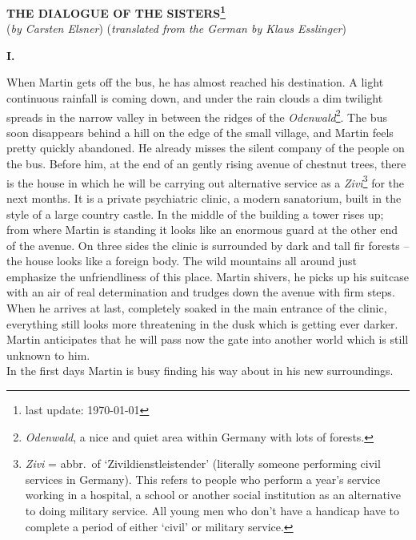 

\begin {center} 
{\bf THE DIALOGUE OF THE SISTERS\footnote{last update: \today}} 
\[\] 
({\em by Carsten Elsner\/}) 
({\em translated from the German by Klaus Esslinger\/}) 
\end {center} 


\begin {center} 
{\bf I.} 
\end {center}
When Martin gets off the bus, he has almost reached his destination. 
A light continuous rainfall is coming down, and under the rain clouds a dim
twilight spreads in the narrow valley in between the ridges of the 
{\em Odenwald\/}\footnote {{\em Odenwald}, a nice and quiet area 
within Germany with lots of forests.}. 
The bus soon disappears behind a hill on the edge of the small village, 
and Martin feels pretty quickly abandoned. He already misses the silent company of the people on the bus. 
Before him, at the end of an gently rising avenue of chestnut trees, there
is the house in which he will be carrying out alternative service as a {\em Zivi\/}\footnote {{\em Zivi} 
= abbr.\ of `Zivildienstleistender' (literally someone performing civil services in Germany).
This refers to people who perform a year's service working in a hospital, a school 
or another social institution as an alternative to doing military service. All young men 
who don't have a handicap have to complete a period of either `civil' or military 
service.} for the next months.
It is a private psychiatric clinic, a modern sanatorium, built in the style of 
a large country castle. 
In the middle of the building a tower rises up; from where Martin is standing 
it looks like an enormous guard at the other end of the avenue. 
On three sides the clinic is surrounded by dark and tall fir forests -- the 
house looks like a foreign body. 
The wild mountains all around just emphasize the unfriendliness of this place. 
Martin shivers, he picks up his suitcase with an air of real determination and 
trudges down the avenue with firm steps. 
When he arrives at last, completely soaked in the main entrance of the clinic,
everything still looks more threatening in the dusk which is getting ever darker. 
Martin anticipates that he will pass now the gate into another world which is 
still unknown to him. \\ 
In the first days Martin is busy finding his way about in his new surroundings. 
